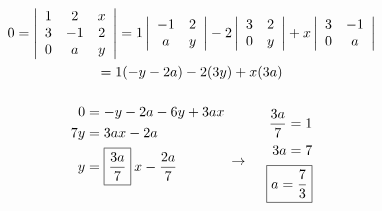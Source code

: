 \documentclass[]{article}
\newcommand{\detmat}[1]{
	\left|\hspace{0.5em}
	\begin{matrix}
		#1
	\end{matrix}
	\hspace{0.5em}\right|
}
\begin{document}
	\section{}
	\begin{gather*}
		0 = \detmat{1&2&x\\3&-1&2\\0&a&y} = 1\detmat{-1&2\\a&y} - 2\detmat{3&2\\0&y} + x\detmat{3&-1\\0&a}\\
		= 1(-y - 2a) - 2(3y) + x(3a)\\
		\begin{aligned}
			0 &= -y -2a - 6y + 3ax\\
			7y &= 3ax - 2a\\
			y &= \boxed{\frac{3a}{7}}\:x - \frac{2a}{7}
		\end{aligned}
		\begin{array}{c}\\ \\ \rightarrow \end{array}
		\quad
		\begin{aligned}\\
			\frac{3a}{7} = 1\\
			3a = 7\\
			\boxed{a = \frac{7}{3}}
		\end{aligned}
	\end{gather*}
\end{document}
